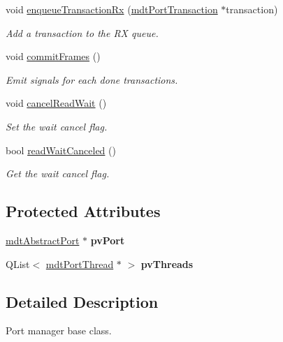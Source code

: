 \begin{DoxyCompactItemize}
void \hyperlink{classmdt_port_manager_ab30fc99951b2b6a566422c7525106ddf}{enqueueTransactionRx} (\hyperlink{classmdt_port_transaction}{mdtPortTransaction} $\ast$transaction)
\begin{DoxyCompactList}\small\item\em Add a transaction to the RX queue. \end{DoxyCompactList}\item 
void \hyperlink{classmdt_port_manager_a84d37b380080eb26e56c68424dedd958}{commitFrames} ()
\begin{DoxyCompactList}\small\item\em Emit signals for each done transactions. \end{DoxyCompactList}\item 
void \hyperlink{classmdt_port_manager_a016996e823cc729eb1f595307f3dd1cf}{cancelReadWait} ()
\begin{DoxyCompactList}\small\item\em Set the wait cancel flag. \end{DoxyCompactList}\item 
bool \hyperlink{classmdt_port_manager_a83ade128d6e70f7216355e9df840c2a6}{readWaitCanceled} ()
\begin{DoxyCompactList}\small\item\em Get the wait cancel flag. \end{DoxyCompactList}\end{DoxyCompactItemize}
\subsection*{Protected Attributes}
\begin{DoxyCompactItemize}
\item 
\hypertarget{classmdt_port_manager_af856162aab4f1c5202c1dfb330fae538}{
\hyperlink{classmdt_abstract_port}{mdtAbstractPort} $\ast$ {\bfseries pvPort}}
\label{classmdt_port_manager_af856162aab4f1c5202c1dfb330fae538}

\item 
\hypertarget{classmdt_port_manager_a8e0d49b789f8b01d469e84b487799573}{
QList$<$ \hyperlink{classmdt_port_thread}{mdtPortThread} $\ast$ $>$ {\bfseries pvThreads}}
\label{classmdt_port_manager_a8e0d49b789f8b01d469e84b487799573}

\end{DoxyCompactItemize}


\subsection{Detailed Description}
Port manager base class. 

